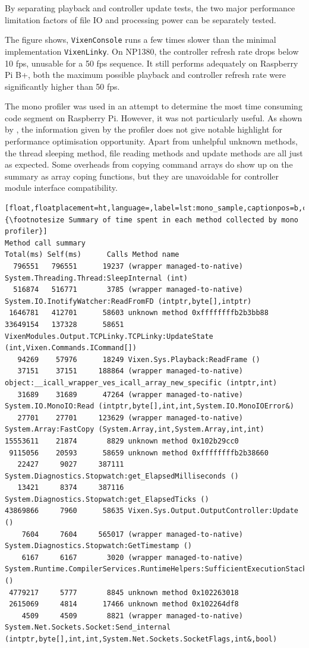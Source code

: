 By separating playback and controller update tests, the two major performance limitation factors of file IO and processing power can be separately tested.

The figure shows, \texttt{VixenConsole} runs a few times slower than the minimal implementation \texttt{VixenLinky}. On NP1380, the controller refresh rate drops below 10 fps, unusable for a 50 fps sequence. It still performs adequately on Raspberry Pi B+, both the maximum possible playback and controller refresh rate were significantly higher than 50 fps.

The mono profiler was used in an attempt to determine the most time consuming code segment on Raspberry Pi. However, it was not particularly useful. As shown by , the information given by the profiler does not give notable highlight for performance optimisation opportunity. Apart from unhelpful unknown methods, the thread sleeping method, file reading methods and update methods are all just as expected. Some overheads from copying command arrays do show up on the summary as array coping functions, but they are unavoidable for controller module interface compatibility.

\begin{lstlisting}[float,floatplacement=ht,language=,label=lst:mono_sample,captionpos=b,caption={\footnotesize Summary of time spent in each method collected by mono profiler}]
Method call summary
Total(ms) Self(ms)      Calls Method name
  796551   796551      19237 (wrapper managed-to-native) System.Threading.Thread:SleepInternal (int)
  516874   516771       3785 (wrapper managed-to-native) System.IO.InotifyWatcher:ReadFromFD (intptr,byte[],intptr)
 1646781   412701      58603 unknown method 0xffffffffb2b3bb88
33649154   137328      58651 VixenModules.Output.TCPLinky.TCPLinky:UpdateState (int,Vixen.Commands.ICommand[])
   94269    57976      18249 Vixen.Sys.Playback:ReadFrame ()
   37151    37151     188864 (wrapper managed-to-native) object:__icall_wrapper_ves_icall_array_new_specific (intptr,int)
   31689    31689      47264 (wrapper managed-to-native) System.IO.MonoIO:Read (intptr,byte[],int,int,System.IO.MonoIOError&)
   27701    27701     123629 (wrapper managed-to-native) System.Array:FastCopy (System.Array,int,System.Array,int,int)
15553611    21874       8829 unknown method 0x102b29cc0
 9115056    20593      58659 unknown method 0xffffffffb2b38660
   22427     9027     387111 System.Diagnostics.Stopwatch:get_ElapsedMilliseconds ()
   13421     8374     387116 System.Diagnostics.Stopwatch:get_ElapsedTicks ()
43869866     7960      58635 Vixen.Sys.Output.OutputController:Update ()
    7604     7604     565017 (wrapper managed-to-native) System.Diagnostics.Stopwatch:GetTimestamp ()
    6167     6167       3020 (wrapper managed-to-native) System.Runtime.CompilerServices.RuntimeHelpers:SufficientExecutionStack ()
 4779217     5777       8845 unknown method 0x102263018
 2615069     4814      17466 unknown method 0x102264df8
    4509     4509       8821 (wrapper managed-to-native) System.Net.Sockets.Socket:Send_internal (intptr,byte[],int,int,System.Net.Sockets.SocketFlags,int&,bool)
\end{lstlisting}
